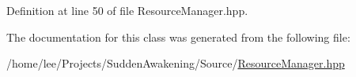 Definition at line 50 of file Resource\-Manager.\-hpp.



The documentation for this class was generated from the following file\-:\begin{DoxyCompactItemize}
\item 
/home/lee/\-Projects/\-Sudden\-Awakening/\-Source/\hyperlink{_resource_manager_8hpp}{Resource\-Manager.\-hpp}\end{DoxyCompactItemize}
